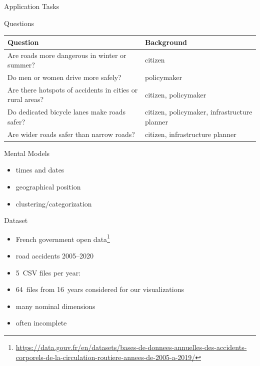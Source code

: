 \documentclass[english]{mlutalk}
\begin{document}
\begin{frame}{Application Tasks}
  \begin{block}{Questions}
    \vspace{1ex}
    \footnotesize
    \begin{tabularx}{\linewidth}{lX}
        \toprule
        \textbf{Question} & \textbf{Background} \\
        \midrule
        Are roads more dangerous in winter or summer? & citizen \\
        Do men or women drive more safely? & policymaker \\
        Are there hotspots of accidents in cities or rural areas? & citizen, policymaker \\
        Do dedicated bicycle lanes make roads safer? & citizen, policymaker, infrastructure planner \\
        Are wider roads safer than narrow roads? & citizen, infrastructure planner \\
        \bottomrule
    \end{tabularx}
  \end{block}
  \begin{block}{Mental Models}
    \begin{itemize}
      \item times and dates
      \item geographical position
      \item clustering/categorization
    \end{itemize}
  \end{block}
\end{frame}

\begin{frame}{Dataset}
  \begin{itemize}
    \item French government open data\footnote{\tiny\url{https://data.gouv.fr/en/datasets/bases-de-donnees-annuelles-des-accidents-corporels-de-la-circulation-routiere-annees-de-2005-a-2019/}}
    \item road accidents 2005--2020
    \item 5~CSV files per year:
    \item 64~files from 16~years considered for our visualizations
    \item many nominal dimensions
    \item often incomplete
  \end{itemize}
\end{frame}
\end{document}
